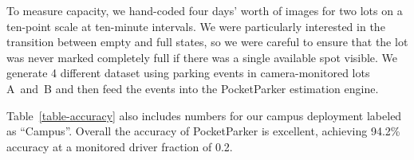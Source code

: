 To measure capacity, we hand-coded four days' worth of images for two lots on
a ten-point scale at ten-minute intervals. We were particularly interested
in the transition between empty and full states, so we were careful to ensure
that the lot was never marked completely full if there was a single available
spot visible. We generate 4 different dataset using parking events in 
camera-monitored lots A~and~B and then feed the events into the PocketParker
estimation engine.

Table~\ref{table-accuracy} also includes numbers for our campus deployment
labeled as ``Campus''. Overall the accuracy of PocketParker is excellent, 
achieving 94.2\% accuracy at a monitored driver fraction of 0.2. 
